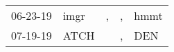 \begin{supertabular}{p{0.07\textwidth}p{0.06\textwidth}p{0.02\textwidth}p{0.02\textwidth}p{0.06\textwidth}}
 06-23-19\textsuperscript{} &  imgr\textsuperscript{} &  , &  , &  hmmt\textsuperscript{} \\
 07-19-19\textsuperscript{} &  ATCH\textsuperscript{} &    &  , &   DEN\textsuperscript{} \\
\end{supertabular}
